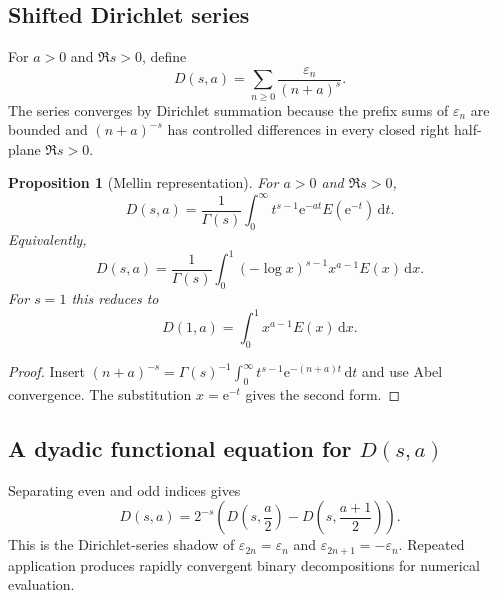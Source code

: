 \documentclass[11pt,oneside]{article}
\newtheorem{proposition}[theorem]{Proposition}
\theoremstyle{definition}
\theoremstyle{remark}
\newcommand{\e}{\mathrm e}
\newcommand{\dd}{\,\mathrm d}
\newcommand{\eps}{\varepsilon}
\begin{document}
\subsection{Shifted Dirichlet series}

For $a>0$ and $\Re s>0$, define
\begin{equation}\label{eq:shifted-dirichlet}
 D(s,a)=\sum_{n\ge0}\frac{\eps_n}{(n+a)^s}.
\end{equation}
The series converges by Dirichlet summation because the prefix sums of
$\eps_n$ are bounded and $(n+a)^{-s}$ has controlled differences in every
closed right half-plane $\Re s>0$.

\begin{proposition}[Mellin representation]\label{prop:mellin-dirichlet}
For $a>0$ and $\Re s>0$,
\begin{equation}\label{eq:mellin-dirichlet}
 \boxed{\qquad
 D(s,a)=\frac1{\Gamma(s)}
 \int_0^\infty t^{s-1}\e^{-at}E(\e^{-t})\dd t.
 \qquad}
\end{equation}
Equivalently,
\begin{equation}\label{eq:unit-interval-dirichlet}
 D(s,a)=\frac1{\Gamma(s)}
 \int_0^1(-\log x)^{s-1}x^{a-1}E(x)\dd x.
\end{equation}
For $s=1$ this reduces to
\begin{equation}\label{eq:integral-D1}
 D(1,a)=\int_0^1x^{a-1}E(x)\dd x.
\end{equation}
\end{proposition}

\begin{proof}
Insert
$(n+a)^{-s}=\Gamma(s)^{-1}\int_0^\infty t^{s-1}\e^{-(n+a)t}\dd t$
and use Abel convergence.  The substitution $x=\e^{-t}$ gives the second
form.
\end{proof}

\subsection{A dyadic functional equation for \texorpdfstring{$D(s,a)$}{D(s,a)}}

Separating even and odd indices gives
\begin{equation}\label{eq:dirichlet-functional}
 D(s,a)=2^{-s}
 \left(D\!\left(s,\frac a2\right)
       -D\!\left(s,\frac{a+1}{2}\right)\right).
\end{equation}
This is the Dirichlet-series shadow of $\eps_{2n}=\eps_n$ and
$\eps_{2n+1}=-\eps_n$.  Repeated application produces rapidly convergent
binary decompositions for numerical evaluation.
\end{document}
